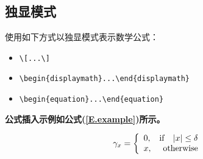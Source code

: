 \subsection{独显模式}

使用如下方式以独显模式表示数学公式：

\begin{itemize}
    \item \verb|\[...\]|
    \item \verb|\begin{displaymath}...\end{displaymath}|
    \item \verb|\begin{equation}...\end{equation}|
\end{itemize}

\textbf{公式插入示例如公式(\ref{E.example})所示。}

\begin{equation}
\gamma_{x}=
\left\{
  \begin{array}{lr}
  0, & {\rm if}~~\;|x| \leq \delta \\
  x, & {\rm otherwise}
  \end{array}
\right.
\label{E.example}
\end{equation}


